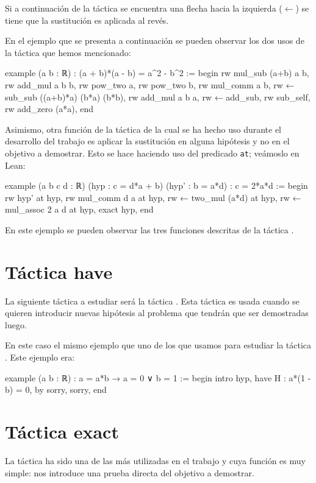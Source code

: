 Si a continuación de la táctica  se encuentra una
flecha hacia la izquierda (\(←\)) se tiene que la sustitución es aplicada
al revés.

En el ejemplo que se presenta a continuación se pueden observar los dos usos
de la táctica  que hemos mencionado:

\begin{leancode}
example (a b : ℝ) : (a + b)*(a - b) = a^2 - b^2 :=
begin
  rw mul_sub (a+b) a b,
  rw add_mul a b b,
  rw pow_two a,
  rw pow_two b,
  rw mul_comm a b,
  rw ← sub_sub ((a+b)*a) (b*a) (b*b),
  rw add_mul a b a,
  rw ← add_sub,
  rw sub_self,
  rw add_zero (a*a), 
end
\end{leancode}

Asimismo, otra función de la táctica  de la cual se
ha hecho uso durante el desarrollo del trabajo es aplicar la sustitución en
alguna hipótesis y no en el objetivo a demostrar. Esto se hace haciendo uso
del predicado \texttt{at}; veámoslo en Lean:
\begin{leancode}
example (a b c d : ℝ) (hyp : c = d*a + b) (hyp' : b = a*d) : c = 2*a*d :=
begin
  rw hyp' at hyp,
  rw mul_comm d a at hyp,
  rw ← two_mul (a*d) at hyp,
  rw ← mul_assoc 2 a d at hyp,
  exact hyp,
end
\end{leancode}

En este ejemplo se pueden observar las tres funciones descritas de la táctica
. 

\section{Táctica have}
La siguiente táctica a estudiar será la táctica . Esta
táctica es usada cuando se quieren introducir nuevas hipótesis al problema que
tendrán que ser demostradas luego.

En este caso el mismo ejemplo que uno de los que usamos para estudiar la táctica
. Este ejemplo era:

\begin{leancode}
example (a b : ℝ) : a = a*b → a = 0 ∨ b = 1 :=
begin
  intro hyp,
  have H : a*(1 - b) = 0, by sorry,
  sorry,
end
\end{leancode}

\section{Táctica exact}
La táctica  ha sido una de las más utilizadas en el
trabajo y cuya función es muy simple: nos introduce una prueba directa del
objetivo a demostrar.

